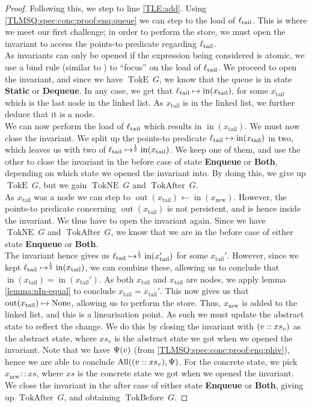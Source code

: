 \documentclass[a4paper, 10pt]{report}
\theoremstyle{definition}
\newcommand{\xsc}{xs}
\newcommand{\AllP}{\operatorname{All}}
\newcommand{\locN}[1]{\loc_{\mathrm{#1}}}
\newcommand{\loctail}{\locN{tail}}
\newcommand{\nIn}[1]{\operatorname{in}(#1)}
\newcommand{\nOut}[1]{\operatorname{out}(#1)}
\newcommand{\node}{x}
\newcommand{\nodeN}[1]{\node_{\mathrm{#1}}}
\newcommand{\nodetail}{\nodeN{tail}}
\newcommand{\nodenew}{\nodeN{new}}
\newcommand{\absvalue}{\val}
\newcommand{\absvalueList}{xs_v}
\newcommand{\StaticState}{\textbf{Static}\xspace}
\newcommand{\EnqueueState}{\textbf{Enqueue}\xspace}
\newcommand{\DequeueState}{\textbf{Dequeue}\xspace}
\newcommand{\BothState}{\textbf{Both}\xspace}
\newcommand{\Qg}{G}
\newcommand{\TokE}[1]{\operatorname{TokE} ~ #1}
\newcommand{\TokEQg}{\TokE{\Qg}}
\newcommand{\TokNE}[1]{\operatorname{TokNE} ~ #1}
\newcommand{\TokNEQg}{\TokNE{\Qg}}
\newcommand{\TokBefore}[1]{\operatorname{TokBefore} ~ #1}
\newcommand{\TokBeforeQg}{\TokBefore{\Qg}}
\newcommand{\TokAfter}[1]{\operatorname{TokAfter} ~ #1}
\newcommand{\TokAfterQg}{\TokAfter{\Qg}}
\begin{document}
\begin{proof}
Following this, we step to line \ref{TLE:add}. Using \ref{TLMSQ:spec:conc:proof:enq:queue} we can step to the load of $\loctail$. This is where we meet our first challenge; in order to perform the store, we must open the invariant to access the points-to predicate regarding $\loctail$.\\
As invariants can only be opened if the expression being considered is atomic, we use a bind rule (similar to ) to ``focus'' on the load of $\loctail$. We proceed to open the invariant, and since we have $\TokEQg$, we know that the queue is in state \StaticState or \DequeueState. In any case, we get that $\loctail \mapsto \nIn{\nodetail}$, for some $\nodetail$ which is the last node in the linked list. As $\nodetail$ is in the linked list, we further deduce that it is a node.\\
We can now perform the load of $\loctail$ which results in $\nIn{\nodetail}$. We must now close the invariant. We split up the points-to predicate $\loctail \mapsto \nIn{\nodetail}$ in two, which leaves us with two of $\loctail \mapsto^{\frac{1}{2}} \nIn{\nodetail}$. We keep one of them, and use the other to close the invariant in the before case of state \EnqueueState or \BothState, depending on which state we opened the invariant into. By doing this, we give up $\TokEQg$, but we gain $\TokNEQg$ and $\TokAfterQg$.\\
As $\nodetail$ was a node we can step to $\nOut{\nodetail} \gets \nIn{\nodenew}$. However, the points-to predicate concerning $\nOut{\nodetail}$ is not persistent, and is hence inside the invariant. We thus have to open the invariant again. Since we have $\TokNEQg$ and $\TokAfterQg$, we know that we are in the before case of either state \EnqueueState or \BothState.\\
The invariant hence gives us $\loctail \mapsto^{\frac{1}{2}} \nIn{\nodetail'}$ for some $\nodetail'$. However, since we kept $\loctail \mapsto^{\frac{1}{2}} \nIn{\nodetail}$, we can combine these, allowing us to conclude that $\nIn{\nodetail} = \nIn{\nodetail'}$. As both $\nodetail$ and $\nodetail$ are nodes, we apply lemma \ref{lemma:nIn-equal} to conclude $\nodetail = \nodetail'$. This now gives us that $\nOut{\nodetail} \mapsto \None$, allowing us to perform the store. Thus, $\nodenew$ is added to the linked list, and this is a linearisation point. As such we must update the abstract state to reflect the change. We do this by closing the invariant with $(\absvalue :: \absvalueList)$ as the abstract state, where $\absvalueList$ is the abstract state we got when we opened the invariant. Note that we have $\Psi(\absvalue)$ (from \ref{TLMSQ:spec:conc:proof:enq:phiv}), hence we are able to conclude $\AllP((\absvalue :: \absvalueList), \Psi)$. For the concrete state, we pick $\nodenew :: \xsc$, where $\xsc$ is the concrete state we got when we opened the invariant. We close the invariant in the after case of either state \EnqueueState or \BothState, giving up $\TokAfterQg$, and obtaining $\TokBeforeQg$.


\end{proof}
\end{document}
